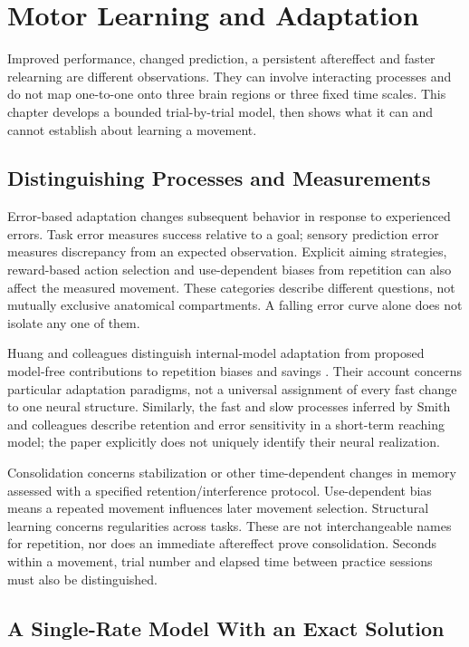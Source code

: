 \chapter{Motor Learning and Adaptation}
\label{ch:motor-learning}

Improved performance, changed prediction, a persistent aftereffect and faster
relearning are different observations. They can involve interacting processes
and do not map one-to-one onto three brain regions or three fixed time scales.
This chapter develops a bounded trial-by-trial model, then shows what it can
and cannot establish about learning a movement.

\section{Distinguishing Processes and Measurements}

Error-based adaptation changes subsequent behavior in response to experienced
errors. Task error measures success relative to a goal; sensory prediction error
measures discrepancy from an expected observation. Explicit aiming strategies,
reward-based action selection and use-dependent biases from repetition can also
affect the measured movement. These categories describe different questions,
not mutually exclusive anatomical compartments. A falling error curve alone
does not isolate any one of them.

Huang and colleagues distinguish internal-model adaptation from proposed
model-free contributions to repetition biases and savings
\cite{Huang2011}. Their account concerns particular adaptation paradigms, not a
universal assignment of every fast change to one neural structure. Similarly,
the fast and slow processes inferred by Smith and colleagues describe retention
and error sensitivity in a short-term reaching model; the paper explicitly
does not uniquely identify their neural realization\cite{SmithDualRate2006Review}.

Consolidation concerns stabilization or other time-dependent changes in memory
assessed with a specified retention/interference protocol. Use-dependent bias
means a repeated movement influences later movement selection. Structural
learning concerns regularities across tasks. These are not interchangeable
names for repetition, nor does an immediate aftereffect prove consolidation.
Seconds within a movement, trial number and elapsed time between practice
sessions must also be distinguished.

\section{A Single-Rate Model With an Exact Solution}

